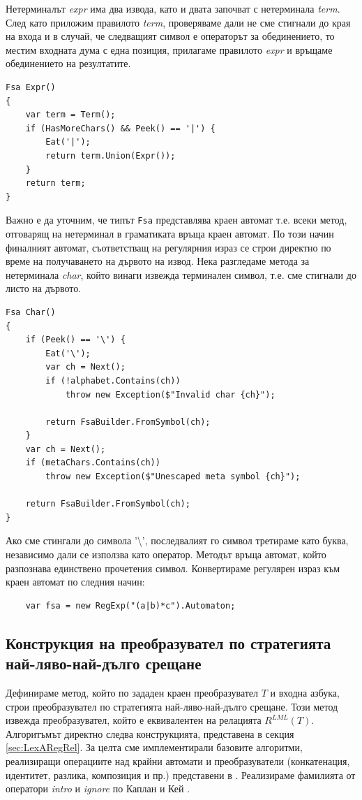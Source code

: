 \documentclass[12pt, oneside]{article}
\theoremstyle{definition}
\begin{document}
Нетерминалът \emph{expr} има два извода, като и двата започват с нетерминала \emph{term}. След като приложим правилото \emph{term}, проверяваме дали не сме стигнали до края на входа и в случай, че следващият символ е операторът за обединението, то местим входната дума с една позиция, прилагаме правилото \emph{expr} и връщаме обединението на резултатите.

\begin{verbatim}
Fsa Expr() 
{
    var term = Term();
    if (HasMoreChars() && Peek() == '|') {
        Eat('|');
        return term.Union(Expr());
    }
    return term;
}
\end{verbatim}

Важно е да уточним, че типът \verb/Fsa/ представлява краен автомат т.е. всеки метод, отговарящ на нетерминал в граматиката връща краен автомат. По този начин финалният автомат, съответстващ на регулярния израз се строи директно по време на получаването на дървото на извод. Нека разгледаме метода за нетерминала \emph{char}, който винаги извежда терминален символ, т.е. сме стигнали до листо на дървото.

\begin{verbatim}
Fsa Char() 
{
	if (Peek() == '\') {
		Eat('\');
		var ch = Next();
        if (!alphabet.Contains(ch))
			throw new Exception($"Invalid char {ch}");

      	return FsaBuilder.FromSymbol(ch);
	}
    var ch = Next();
    if (metaChars.Contains(ch))
		throw new Exception($"Unescaped meta symbol {ch}");

    return FsaBuilder.FromSymbol(ch);
}
\end{verbatim}

Ако сме стингали до символа '\textbackslash', последвалият го символ третираме като буква, независимо дали се използва като оператор. Методът връща автомат, който разпознава единствено прочетения символ. Конвертираме регулярен израз към краен автомат по следния начин:

\begin{verbatim}
	var fsa = new RegExp("(a|b)*c").Automaton;
\end{verbatim}

\subsection{Конструкция на преобразувател по стратегията най-ляво-най-дълго срещане}

Дефинираме метод, който по зададен краен преобразувател \(T\) и входна азбука, строи преобразувател по стратегията най-ляво-най-дълго срещане. Този метод извежда преобразувател, който е еквивалентен на релацията \( R^{LML}(T) \). Алгоритъмът директно следва конструкцията, представена в секция \ref{sec:LexARegRel}. За целта сме имплементирали базовите алгоритми, реализиращи операциите над крайни автомати и преобразуватели (конкатенация, идентитет, разлика, композиция и пр.) представени в \cite{Mihov:2018}. Реализираме фамилията от оператори \emph{intro} и \emph{ignore} по Каплан и Кей \cite{Kaplan&Kay:94}.
\end{document}
